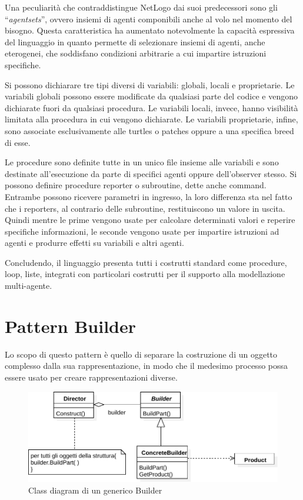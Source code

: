 Una peculiarità che contraddistingue NetLogo dai suoi predecessori sono gli “\textit{agentsets}”, ovvero insiemi di agenti componibili anche al volo nel momento del bisogno. Questa caratteristica ha aumentato notevolmente la capacità espressiva del linguaggio in quanto permette di selezionare insiemi di agenti, anche eterogenei, che soddisfano condizioni arbitrarie a cui impartire istruzioni specifiche.

Si possono dichiarare tre tipi diversi di variabili: globali, locali e proprietarie. Le variabili globali possono essere modificate da qualsiasi parte del codice e vengono dichiarate fuori da qualsiasi procedura. Le variabili locali, invece, hanno visibilità limitata alla procedura in cui vengono dichiarate. Le variabili proprietarie, infine, sono associate esclusivamente alle  turtles o patches oppure a una specifica breed di esse.

Le procedure sono definite tutte in un unico file insieme alle variabili e sono destinate all'esecuzione da parte di specifici agenti oppure dell'observer stesso. Si possono definire procedure reporter o subroutine, dette anche command. Entrambe possono ricevere parametri in ingresso, la loro differenza sta nel fatto che i reporters, al contrario delle subroutine, restituiscono un valore in uscita. Quindi mentre le prime vengono usate per calcolare determinati valori e reperire specifiche informazioni, le seconde vengono usate per impartire istruzioni ad agenti e produrre effetti su variabili e altri agenti. 

Concludendo, il linguaggio presenta tutti i costrutti standard come procedure, loop, liste, integrati con particolari costrutti per il supporto alla modellazione multi-agente.

\section{Pattern Builder}
\label{sec:builder}

Lo scopo di questo pattern è quello di separare la costruzione di un oggetto complesso dalla sua rappresentazione, in modo che il medesimo processo possa essere usato per creare rappresentazioni diverse.

\begin{figure}[htbp]
\centering
\includegraphics[width=\textwidth,height=\textheight,keepaspectratio]{images/builder-design-pattern.pdf}
\caption{Class diagram di un generico Builder}
\label{fig:builder-design-pattern}
\end{figure}

